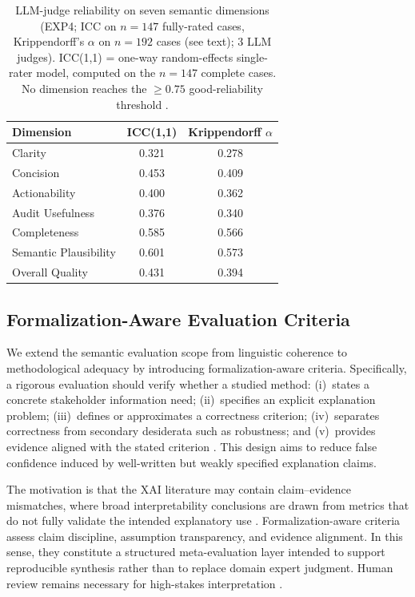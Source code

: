 \documentclass[twoside,11pt]{article}
\begin{document}
\begin{table}[t]
\centering
\caption{LLM-judge reliability on seven semantic dimensions (EXP4; ICC on
$n=147$ fully-rated cases, Krippendorff's $\alpha$ on $n=192$ cases (see
text); 3 LLM judges). ICC(1,1) = one-way random-effects
single-rater model, computed on the $n=147$ complete cases. No dimension reaches the $\geq 0.75$
good-reliability threshold \citep{koo2016guideline}.}
\label{tab:exp4_icc}
\small
\begin{tabular}{lcc}
\toprule
Dimension              & ICC(1,1) & Krippendorff $\alpha$ \\
\midrule
Clarity                & 0.321    & 0.278 \\
Concision              & 0.453    & 0.409 \\
Actionability          & 0.400    & 0.362 \\
Audit Usefulness       & 0.376    & 0.340 \\
Completeness           & 0.585    & 0.566 \\
Semantic Plausibility  & 0.601    & 0.573 \\
Overall Quality        & 0.431    & 0.394 \\
\bottomrule
\end{tabular}
\end{table}

\subsection{Formalization-Aware Evaluation Criteria}
\label{sec:formalization_aware}

We extend the semantic evaluation scope from linguistic coherence to
methodological adequacy by introducing formalization-aware criteria.
Specifically, a rigorous evaluation should verify whether a studied method:
(i)~states a concrete stakeholder information need; (ii)~specifies an
explicit explanation problem; (iii)~defines or approximates a correctness
criterion; (iv)~separates correctness from secondary desiderata such as
robustness; and (v)~provides evidence aligned with the stated criterion
\citep{haufe2026formalization,sokol2020factsheets}. This design aims to
reduce false confidence induced by well-written but weakly specified
explanation claims.

The motivation is that the XAI literature may contain claim--evidence
mismatches, where broad interpretability conclusions are drawn from metrics
that do not fully validate the intended explanatory use
\citep{haufe2026formalization,hedstrom2023quantus}. Formalization-aware
criteria assess claim discipline, assumption transparency, and evidence
alignment. In this sense, they constitute a structured meta-evaluation
layer intended to support reproducible synthesis rather than to replace
domain expert judgment. Human review remains necessary for high-stakes
interpretation \citep{bucinca2020proxy,bansal2021whole,fok2023verifiability}.
\end{document}
